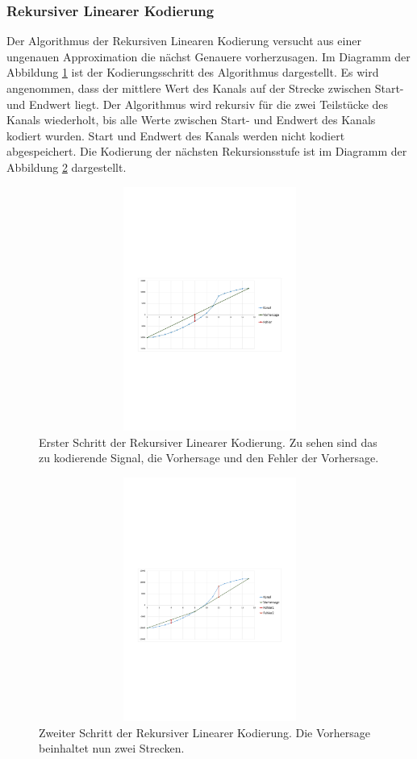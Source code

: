\subsubsection{Rekursiver Linearer Kodierung}
Der Algorithmus der Rekursiven Linearen Kodierung versucht aus einer ungenauen Approximation die nächst Genauere vorherzusagen. Im Diagramm der Abbildung \ref{konzept:loesung2:algorithm:step1} ist der Kodierungsschritt des Algorithmus dargestellt. Es wird angenommen, dass der mittlere Wert des Kanals auf der Strecke zwischen Start- und Endwert liegt. Der Algorithmus wird rekursiv für die zwei Teilstücke des Kanals wiederholt, bis alle Werte zwischen Start- und Endwert des Kanals kodiert wurden. Start und Endwert des Kanals werden nicht kodiert abgespeichert. Die Kodierung der nächsten Rekursionsstufe ist im Diagramm der Abbildung \ref{konzept:loesung2:algorithm:step2} dargestellt.
\begin{figure}[!htbp]
	\center
	\includegraphics[trim = 1.8cm 10cm 1.8cm 11cm, clip=true, width=1\textwidth,height=8cm,keepaspectratio]{./pictures/konzept/solution2/algorithm_step1.pdf}
	\caption{Erster Schritt der Rekursiver Linearer Kodierung. Zu sehen sind das zu kodierende Signal, die Vorhersage und den Fehler der Vorhersage.}
	\label{konzept:loesung2:algorithm:step1}
\end{figure} 
\begin{figure}[!htbp]
	\center
	\includegraphics[trim = 1.8cm 10cm 1.8cm 11cm, clip=true,width=1\textwidth,height=8cm,keepaspectratio]{./pictures/konzept/solution2/algorithm_step2.pdf}
	\caption{Zweiter Schritt der Rekursiver Linearer Kodierung. Die Vorhersage beinhaltet nun zwei Strecken.}
	\label{konzept:loesung2:algorithm:step2}
\end{figure} 

